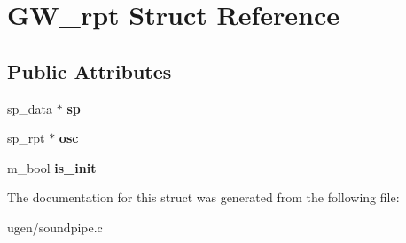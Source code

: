\hypertarget{structGW__rpt}{}\section{G\+W\+\_\+rpt Struct Reference}
\label{structGW__rpt}
\subsection*{Public Attributes}
\begin{DoxyCompactItemize}
\item 
\hypertarget{structGW__rpt_af00d6373274ae196cd1a145457c9324d}{}\label{structGW__rpt_af00d6373274ae196cd1a145457c9324d} 
sp\+\_\+data $\ast$ {\bfseries sp}
\item 
\hypertarget{structGW__rpt_a4d244b8a2200bd36b4bbed6a9d1f56f9}{}\label{structGW__rpt_a4d244b8a2200bd36b4bbed6a9d1f56f9} 
sp\+\_\+rpt $\ast$ {\bfseries osc}
\item 
\hypertarget{structGW__rpt_a0b75f82734ac2295800b092d6107f303}{}\label{structGW__rpt_a0b75f82734ac2295800b092d6107f303} 
m\+\_\+bool {\bfseries is\+\_\+init}
\end{DoxyCompactItemize}


The documentation for this struct was generated from the following file\+:\begin{DoxyCompactItemize}
\item 
ugen/soundpipe.\+c\end{DoxyCompactItemize}
